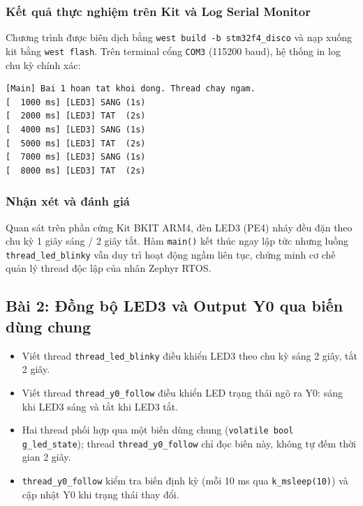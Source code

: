 \subsubsection{Kết quả thực nghiệm trên Kit và Log Serial Monitor}
Chương trình được biên dịch bằng \texttt{west build -b stm32f4\_disco} và nạp xuống kit bằng \texttt{west flash}. Trên terminal cổng \texttt{COM3} (115200 baud), hệ thống in log chu kỳ chính xác:
\begin{lstlisting}
[Main] Bai 1 hoan tat khoi dong. Thread chay ngam.
[  1000 ms] [LED3] SANG (1s)
[  2000 ms] [LED3] TAT  (2s)
[  4000 ms] [LED3] SANG (1s)
[  5000 ms] [LED3] TAT  (2s)
[  7000 ms] [LED3] SANG (1s)
[  8000 ms] [LED3] TAT  (2s)
\end{lstlisting}

\subsubsection{Nhận xét và đánh giá}
Quan sát trên phần cứng Kit BKIT ARM4, đèn LED3 (PE4) nháy đều đặn theo chu kỳ 1 giây sáng / 2 giây tắt. Hàm \texttt{main()} kết thúc ngay lập tức nhưng luồng \texttt{thread\_led\_blinky} vẫn duy trì hoạt động ngầm liên tục, chứng minh cơ chế quản lý thread độc lập của nhân Zephyr RTOS.

\newpage
\subsection{Bài 2: Đồng bộ LED3 và Output Y0 qua biến dùng chung}

\begin{tcolorbox}[
    enhanced,
    colback=black!2,
    colframe=black!60,
    boxrule=1pt,
    arc=2.5mm,
    drop shadow,
    attach boxed title to top left={xshift=4mm, yshift=-3mm},
    boxed title style={
        enhanced,
        colback=black!85,
        colframe=black!85,
        boxrule=1pt,
        arc=2.5mm,
        drop shadow,
        left=6pt, right=6pt, top=2pt, bottom=2pt
    },
    title=\textcolor{white}{\large\textbf{Yêu cầu đề bài (Trích phiếu bài tập)}}
]
\bfseries
\vspace{0.2cm}
\begin{itemize}
    \item Viết thread \texttt{thread\_led\_blinky} điều khiển LED3 theo chu kỳ sáng 2 giây, tắt 2 giây.
    \item Viết thread \texttt{thread\_y0\_follow} điều khiển LED trạng thái ngõ ra Y0: sáng khi LED3 sáng và tắt khi LED3 tắt.
    \item Hai thread phối hợp qua một biến dùng chung (\texttt{volatile bool g\_led\_state}); thread \texttt{thread\_y0\_follow} chỉ đọc biến này, không tự đếm thời gian 2 giây.
    \item \texttt{thread\_y0\_follow} kiểm tra biến định kỳ (mỗi 10 ms qua \texttt{k\_msleep(10)}) và cập nhật Y0 khi trạng thái thay đổi.
\end{itemize}
\end{tcolorbox}

